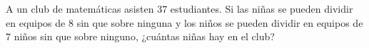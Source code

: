 A un club de matemáticas asisten $37$ estudiantes. Si las niñas se pueden dividir en equipos de $8$ sin que sobre ninguna y los niños se pueden dividir en equipos de $7$ niños sin que sobre ninguno, ¿cuántas niñas hay en el club?